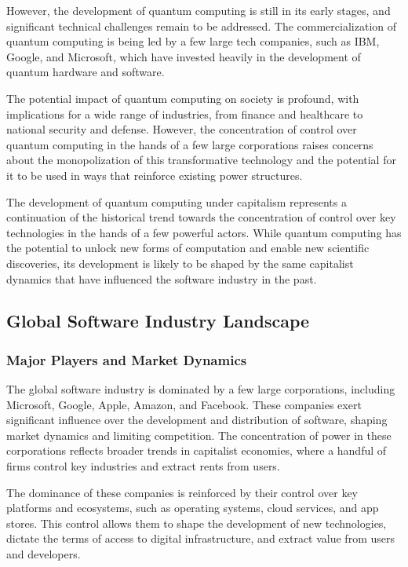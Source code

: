 \begin{refsection}
\begin{multicols}{2}
{However, the development of quantum computing is still in its early stages, and significant technical challenges remain to be addressed. The commercialization of quantum computing is being led by a few large tech companies, such as IBM, Google, and Microsoft, which have invested heavily in the development of quantum hardware and software.

The potential impact of quantum computing on society is profound, with implications for a wide range of industries, from finance and healthcare to national security and defense. However, the concentration of control over quantum computing in the hands of a few large corporations raises concerns about the monopolization of this transformative technology and the potential for it to be used in ways that reinforce existing power structures.

The development of quantum computing under capitalism represents a continuation of the historical trend towards the concentration of control over key technologies in the hands of a few powerful actors. While quantum computing has the potential to unlock new forms of computation and enable new scientific discoveries, its development is likely to be shaped by the same capitalist dynamics that have influenced the software industry in the past.

\subsection{Global Software Industry Landscape}

\subsubsection{Major Players and Market Dynamics}

The global software industry is dominated by a few large corporations, including Microsoft, Google, Apple, Amazon, and Facebook. These companies exert significant influence over the development and distribution of software, shaping market dynamics and limiting competition. The concentration of power in these corporations reflects broader trends in capitalist economies, where a handful of firms control key industries and extract rents from users.

The dominance of these companies is reinforced by their control over key platforms and ecosystems, such as operating systems, cloud services, and app stores. This control allows them to shape the development of new technologies, dictate the terms of access to digital infrastructure, and extract value from users and developers.

}
\end{multicols}
\end{refsection}
